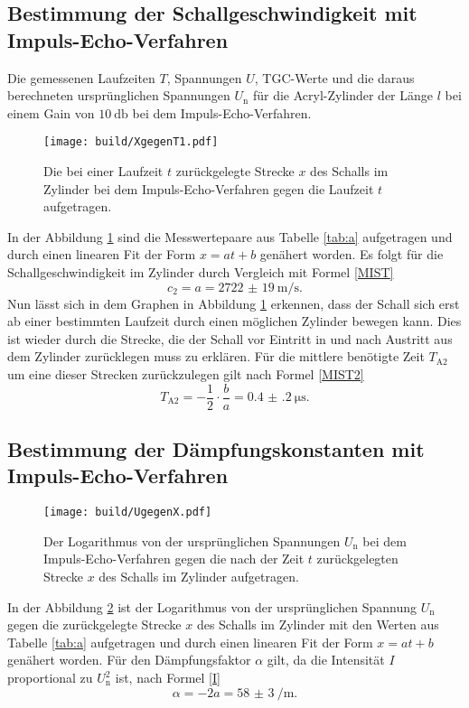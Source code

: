 \subsection{Bestimmung der Schallgeschwindigkeit mit Impuls-Echo-Verfahren}
\begin{table}
	\centering
	\caption{Die gemessenen Laufzeiten $T$, Spannungen $U$, TGC-Werte und die daraus berechneten ursprünglichen Spannungen $U_\text{n}$ für die Acryl-Zylinder der Länge $l$ bei einem Gain von $\SI{10}{\decibel}$ bei dem Impuls-Echo-Verfahren.}
	
\end{table}
\begin{figure}
	\centering
	\caption{Die bei einer Laufzeit $t$ zurückgelegte Strecke $x$ des Schalls im Zylinder bei dem Impuls-Echo-Verfahren gegen die Laufzeit $t$ aufgetragen.}
	\texttt{[image: build/XgegenT1.pdf]}
	\label{fig:XgegenT1}
\end{figure}
In der Abbildung \ref{fig:XgegenT1} sind die Messwertepaare aus Tabelle \ref{tab:a} aufgetragen und durch einen linearen Fit der Form $x=a t + b$ genähert worden.
Es folgt für die Schallgeschwindigkeit im Zylinder durch Vergleich mit Formel \eqref{MIST}
\begin{equation}
	c_2=a=\SI{2722(19)}{\meter\per\second}\text{.}
\end{equation}
Nun lässt sich in dem Graphen in Abbildung \ref{fig:XgegenT1} erkennen, dass der Schall sich erst ab einer bestimmten Laufzeit durch einen möglichen Zylinder bewegen kann. Dies ist wieder durch die Strecke, die der Schall vor Eintritt in und nach Austritt aus dem Zylinder zurücklegen muss zu erklären. Für die mittlere benötigte Zeit $T_{\text{A}2}$ um eine dieser Strecken zurückzulegen gilt nach Formel \eqref{MIST2}
\begin{equation}
	T_{\text{A}2}=-\frac{1}{2} \cdot \frac{b}{a}=\SI{0.4(2)}{\micro\second}\text{.}
\end{equation}

\subsection{Bestimmung der Dämpfungskonstanten mit Impuls-Echo-Verfahren}
\begin{figure}
	\centering
	\caption{Der Logarithmus von der ursprünglichen Spannungen $U_\text{n}$ bei dem Impuls-Echo-Verfahren gegen die nach der Zeit $t$ zurückgelegten Strecke $x$ des Schalls im Zylinder aufgetragen.}
	\texttt{[image: build/UgegenX.pdf]}
	\label{fig:UgegenX}
\end{figure}
In der Abbildung \ref{fig:UgegenX} ist der Logarithmus von der ursprünglichen Spannung $U_\text{n}$ gegen die zurückgelegte Strecke $x$ des Schalls im Zylinder mit den Werten aus Tabelle \ref{tab:a} aufgetragen und durch einen linearen Fit der Form $x=a t + b$ genähert worden. Für den Dämpfungsfaktor $\alpha$ gilt, da die Intensität $I$ proportional zu $U_\text{n}^2$ ist, nach Formel \eqref{I}
\begin{equation}
	\alpha=-2 a = \SI{58(3)}{\per\meter}\text{.}
\end{equation}



